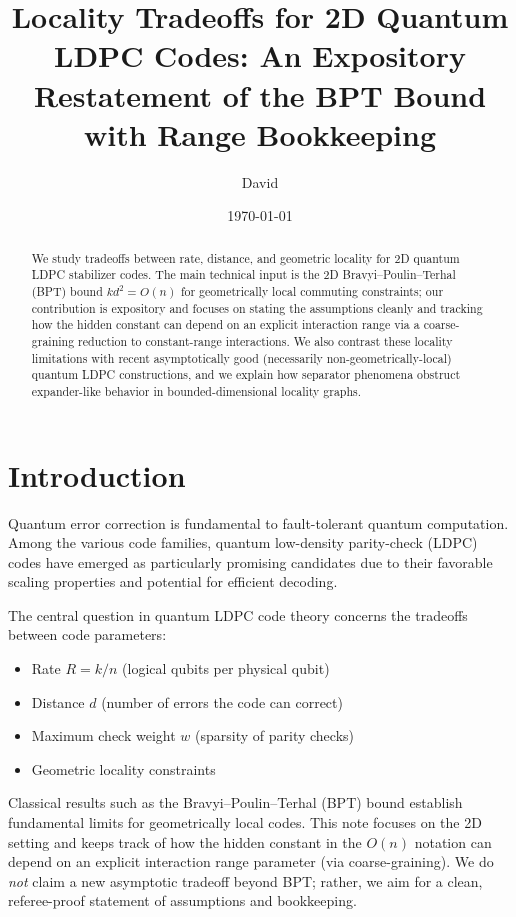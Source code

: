 \documentclass[11pt,a4paper]{article}
\title{Locality Tradeoffs for 2D Quantum LDPC Codes: An Expository Restatement of the BPT Bound with Range Bookkeeping}
\author{David}
\date{\today}
\theoremstyle{definition}
\theoremstyle{remark}
\begin{document}
\maketitle

\begin{abstract}
We study tradeoffs between rate, distance, and geometric locality for 2D quantum LDPC stabilizer codes. The main technical input is the 2D Bravyi--Poulin--Terhal (BPT) bound $k d^2 = O(n)$ for geometrically local commuting constraints; our contribution is expository and focuses on stating the assumptions cleanly and tracking how the hidden constant can depend on an explicit interaction range via a coarse-graining reduction to constant-range interactions. We also contrast these locality limitations with recent asymptotically good (necessarily non-geometrically-local) quantum LDPC constructions, and we explain how separator phenomena obstruct expander-like behavior in bounded-dimensional locality graphs.
\end{abstract}

\section{Introduction}

Quantum error correction is fundamental to fault-tolerant quantum computation. Among the various code families, quantum low-density parity-check (LDPC) codes have emerged as particularly promising candidates due to their favorable scaling properties and potential for efficient decoding.

The central question in quantum LDPC code theory concerns the tradeoffs between code parameters:
\begin{itemize}
    \item Rate $R = k/n$ (logical qubits per physical qubit)
    \item Distance $d$ (number of errors the code can correct)
    \item Maximum check weight $w$ (sparsity of parity checks)
    \item Geometric locality constraints
\end{itemize}

Classical results such as the Bravyi--Poulin--Terhal (BPT) bound \cite{BPT} establish fundamental limits for geometrically local codes. This note focuses on the 2D setting and keeps track of how the hidden constant in the $O(n)$ notation can depend on an explicit interaction range parameter (via coarse-graining). We do \emph{not} claim a new asymptotic tradeoff beyond BPT; rather, we aim for a clean, referee-proof statement of assumptions and bookkeeping.
\end{document}
